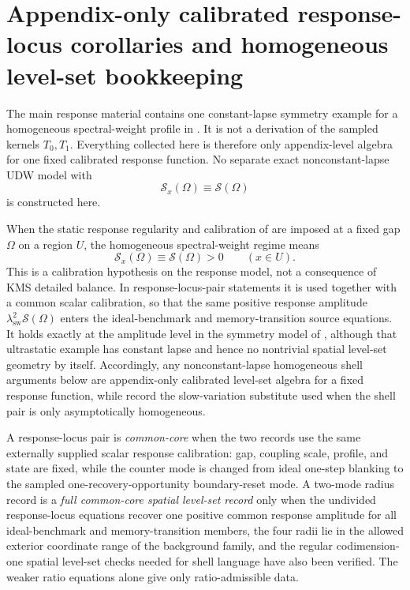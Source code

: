 \section{Appendix-only calibrated response-locus corollaries and homogeneous level-set bookkeeping}\label{app:abstract-homogeneous-main}

The main response material contains one constant-lapse symmetry example for a
homogeneous spectral-weight profile in .
It is not a derivation of the sampled kernels \(T_0,T_1\).  Everything
collected here is therefore only appendix-level algebra for one fixed
calibrated response function. No separate exact nonconstant-lapse UDW model
with
\[
\mathcal S_x(\Omega)\equiv\mathcal S(\Omega)
\]
is constructed here.

\begin{assumption}\label{ass:homogeneous-spectral-main}
When the static response regularity and calibration of
 are imposed at a fixed gap $\Omega$ on a region
$U$, the homogeneous spectral-weight regime means
\[
\mathcal S_x(\Omega)\equiv\mathcal S(\Omega)>0\qquad(x\in U).
\]
This is a calibration hypothesis on the response model, not a consequence of
KMS detailed balance. In response-locus-pair statements it is used together with a
common scalar calibration, so that the same positive response amplitude
$\lambda_{\mathrm{sw}}^2\mathcal S(\Omega)$ enters the ideal-benchmark and
memory-transition source equations. It holds exactly at the amplitude level in
the symmetry model of , although that
ultrastatic example has constant lapse and hence no nontrivial spatial
level-set geometry
by itself. Accordingly, any nonconstant-lapse homogeneous shell arguments below
are appendix-only calibrated level-set algebra for a fixed response function,
while  record
the slow-variation substitute used when the shell pair is only asymptotically
homogeneous.
\end{assumption}

\begin{definition}\label{def:common-core-shell-data-main}
A response-locus pair is \emph{common-core} when the two records use the same
externally supplied scalar response calibration: gap, coupling scale, profile,
and state are fixed, while the counter mode is changed from
ideal one-step blanking to the sampled one-recovery-opportunity boundary-reset mode. A two-mode radius
record is a \emph{full common-core spatial level-set record} only when the
undivided response-locus equations recover one positive common response
amplitude for all ideal-benchmark and memory-transition members, the four radii
lie in the allowed exterior coordinate range of the background family, and the
regular codimension-one spatial level-set checks needed for shell language have
also been verified. The weaker ratio equations alone give only
ratio-admissible data.
\end{definition}

